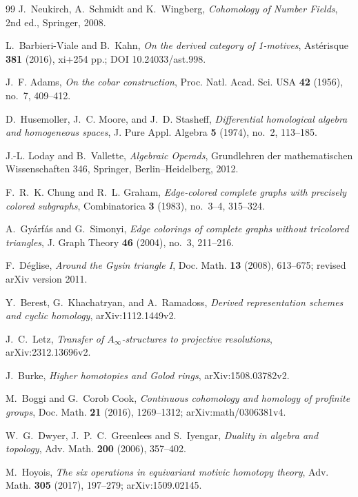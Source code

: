 \documentclass[11pt]{article}
\theoremstyle{remark}
\begin{document}
\begin{thebibliography}{99}
J.~Neukirch, A.~Schmidt and K.~Wingberg,
\emph{Cohomology of Number Fields},
2nd ed., Springer, 2008.

L.~Barbieri-Viale and B.~Kahn,
\emph{On the derived category of 1-motives},
Ast\'erisque \textbf{381} (2016), xi+254 pp.; DOI 10.24033/ast.998.

J.~F. Adams,
\emph{On the cobar construction},
Proc. Natl. Acad. Sci. USA \textbf{42} (1956), no.~7, 409--412.

D.~Husemoller, J.~C. Moore, and J.~D. Stasheff,
\emph{Differential homological algebra and homogeneous spaces},
J. Pure Appl. Algebra \textbf{5} (1974), no.~2, 113--185.

J.-L. Loday and B.~Vallette,
\emph{Algebraic Operads},
Grundlehren der mathematischen Wissenschaften 346,
Springer, Berlin--Heidelberg, 2012.

F.~R.~K. Chung and R.~L. Graham,
\emph{Edge-colored complete graphs with precisely colored subgraphs},
Combinatorica \textbf{3} (1983), no.~3--4, 315--324.

A.~Gy\'arf\'as and G.~Simonyi,
\emph{Edge colorings of complete graphs without tricolored triangles},
J. Graph Theory \textbf{46} (2004), no.~3, 211--216.

F.~D\'eglise,
\emph{Around the Gysin triangle I},
Doc. Math. \textbf{13} (2008), 613--675; revised arXiv version 2011.

Y.~Berest, G.~Khachatryan, and A.~Ramadoss,
\emph{Derived representation schemes and cyclic homology},
arXiv:1112.1449v2.

J.~C.~Letz,
\emph{Transfer of $A_\infty$-structures to projective resolutions},
arXiv:2312.13696v2.

J.~Burke,
\emph{Higher homotopies and Golod rings},
arXiv:1508.03782v2.

M.~Boggi and G.~Corob Cook,
\emph{Continuous cohomology and homology of profinite groups},
Doc. Math. \textbf{21} (2016), 1269--1312; arXiv:math/0306381v4.

W.~G.~Dwyer, J.~P.~C.~Greenlees and S.~Iyengar,
\emph{Duality in algebra and topology},
Adv. Math. \textbf{200} (2006), 357--402.

M.~Hoyois,
\emph{The six operations in equivariant motivic homotopy theory},
Adv. Math. \textbf{305} (2017), 197--279;
arXiv:1509.02145.


\end{thebibliography}
\end{document}
